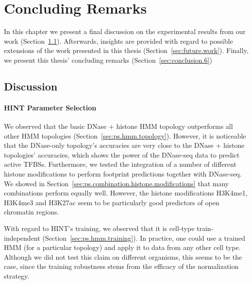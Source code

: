\chapter{Concluding Remarks}
\label{cha:concluding.remarks}

\graphicspath{{chapter6/figs/}}

In this chapter we present a final discussion on the experimental results from our work (Section~\ref{sec:discussion}). Afterwards, insights are provided with regard to possible extensions of the work presented in this thesis (Section~\ref{sec:future.work}). Finally, we present this thesis' concluding remarks (Section~\ref{sec:conclusion.6})

\section{Discussion}
\label{sec:discussion}

\subsubsection{HINT Parameter Selection}

We observed that the basic DNase + histone HMM topology outperforms all other HMM topologies (Section~\ref{sec:ps.hmm.topology}). However, it is noticeable that the DNase-only topology's accuracies are very close to the DNase + histone topologies' accuracies, which shows the power of the DNase-seq data to predict active TFBSs. Furthermore, we tested the integration of a number of different histone modifications to perform footprint predictions together with DNase-seq. We showed in Section~\ref{sec:ps.combination.histone.modifications} that many combinations perform equally well. However, the histone modifications H3K4me1, H3K4me3 and H3K27ac seem to be particularly good predictors of open chromatin regions.

With regard to HINT's training, we observed that it is cell-type train-independent (Section~\ref{sec:ps.hmm.training}). In practice, one could use a trained HMM (for a particular topology) and apply it to data from any other cell type. Although we did not test this claim on different organisms, this seems to be the case, since the training robustness stems from the efficacy of the normalization strategy.

